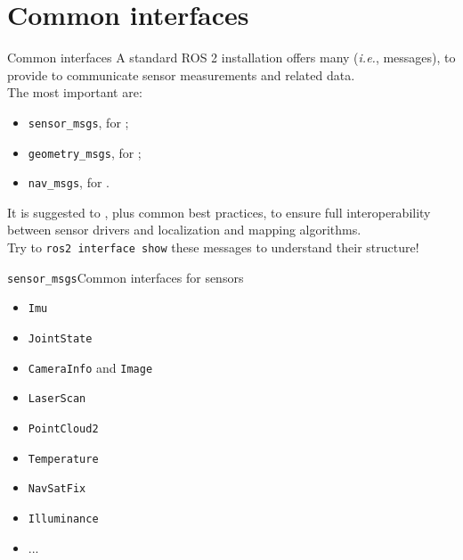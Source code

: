 
\section{Common interfaces}

\begin{frame}{Common interfaces}
	A standard ROS 2 installation offers many  (\emph{i.e.}, messages), to provide  to communicate sensor measurements and related data.\\
	\bigskip
	The most important are:
	\begin{itemize}
		\item \texttt{sensor\_msgs}, for ;
		\item \texttt{geometry\_msgs}, for ;
		\item \texttt{nav\_msgs}, for .
	\end{itemize}
	\medskip
	It is suggested to , plus common best practices, to ensure full interoperability between sensor drivers and localization and mapping algorithms.\\
  \bigskip
  Try to \texttt{ros2 interface show} these messages to understand their structure!
\end{frame}

\begin{frame}{\texttt{sensor\_msgs}}{Common interfaces for sensors}
	\begin{itemize}
		\item \texttt{Imu}
		\item \texttt{JointState}
		\item \texttt{CameraInfo} and \texttt{Image}
		\item \texttt{LaserScan}
		\item \texttt{PointCloud2}
		\item \texttt{Temperature}
		\item \texttt{NavSatFix}
		\item \texttt{Illuminance}
		\item ...
	\end{itemize}
\end{frame}

